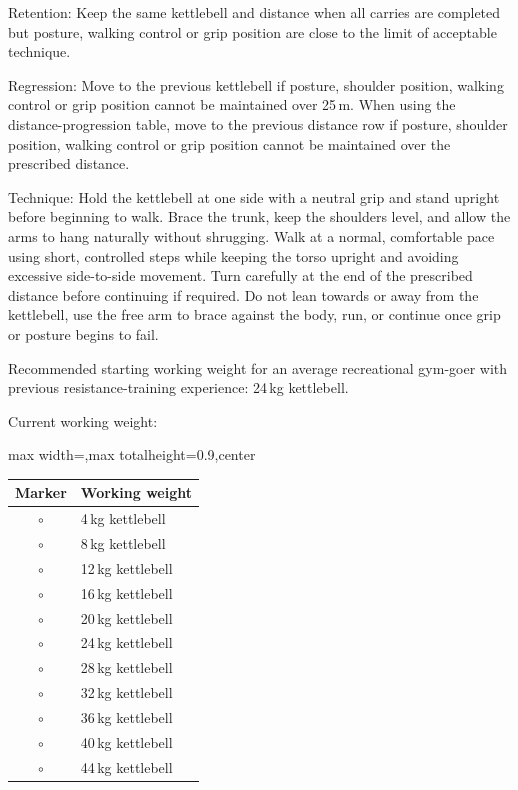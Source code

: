 \documentclass[11pt,a4paper]{article}
\newcommand{\tablearraystretch}{1.15}
\begin{document}
Retention: Keep the same kettlebell and distance when all carries are completed but posture, walking control or grip position are close to the limit of acceptable technique.

Regression: Move to the previous kettlebell if posture, shoulder position, walking control or grip position cannot be maintained over 25\,m. When using the distance-progression table, move to the previous distance row if posture, shoulder position, walking control or grip position cannot be maintained over the prescribed distance.

Technique: Hold the kettlebell at one side with a neutral grip and stand upright before beginning to walk. Brace the trunk, keep the shoulders level, and allow the arms to hang naturally without shrugging. Walk at a normal, comfortable pace using short, controlled steps while keeping the torso upright and avoiding excessive side-to-side movement. Turn carefully at the end of the prescribed distance before continuing if required. Do not lean towards or away from the kettlebell, use the free arm to brace against the body, run, or continue once grip or posture begins to fail.

Recommended starting working weight for an average recreational gym-goer with previous resistance-training experience: 24\,kg kettlebell.

Current working weight:

\begin{center}
\renewcommand{\arraystretch}{\tablearraystretch}
\begin{adjustbox}{max width=\linewidth,max totalheight=0.9\textheight,center}
\begin{tabular}{cl}
\toprule
Marker & Working weight \\
\midrule
$\circ$ & 4\,kg kettlebell \\
$\circ$ & 8\,kg kettlebell \\
$\circ$ & 12\,kg kettlebell \\
$\circ$ & 16\,kg kettlebell \\
$\circ$ & 20\,kg kettlebell \\
$\circ$ & 24\,kg kettlebell \\
$\circ$ & 28\,kg kettlebell \\
$\circ$ & 32\,kg kettlebell \\
$\circ$ & 36\,kg kettlebell \\
$\circ$ & 40\,kg kettlebell \\
$\circ$ & 44\,kg kettlebell \\
\bottomrule
\end{tabular}
\end{adjustbox}
\renewcommand{\arraystretch}{1}
\end{center}
\end{document}
